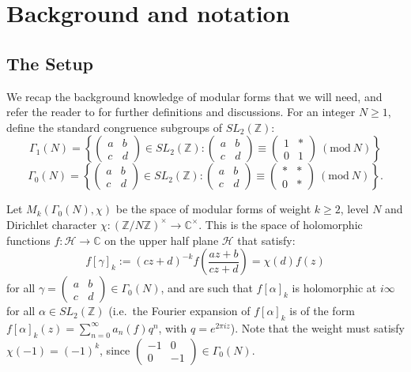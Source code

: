 \documentclass{amsart}
\theoremstyle{plain}
\theoremstyle{definition}
\newcommand*{\field}[1]{\mathbb{#1}}
\begin{document}
\section{Background and notation}
\subsection{The Setup}
We recap the background knowledge of modular forms that we will need, and refer the reader to \cite{diamond_shurman_2016} for further definitions and discussions. For an integer $N \geq 1$, define the standard congruence subgroups of $SL_2(\field{Z})$:
\begin{equation*}
    \Gamma_1(N)=\left\{ \begin{pmatrix} a & b \\ c & d \end{pmatrix} \in SL_2(\field{Z}) : \begin{pmatrix} a & b \\ c & d \end{pmatrix} \equiv \begin{pmatrix} 1 & * \\ 0 & 1 \end{pmatrix} \ (\text{mod} \ N)  \right\}
\end{equation*}
\begin{equation*}
    \Gamma_0(N)=\left\{ \begin{pmatrix} a & b \\ c & d \end{pmatrix} \in SL_2(\field{Z}) : \begin{pmatrix} a & b \\ c & d \end{pmatrix} \equiv \begin{pmatrix} * & * \\ 0 & * \end{pmatrix} \ (\text{mod} \ N)  \right\}.
\end{equation*}

Let $M_k(\Gamma_0(N), \chi)$ be the space of modular forms of weight $k \geq 2$, level $N$ and Dirichlet character $\chi : (\field{Z}/N\field{Z})^\times \rightarrow \field{C}^\times$. This is the space of holomorphic functions $f:\mathcal{H}\rightarrow\mathbb{C}$ on the upper half plane $\mathcal{H}$ that  satisfy:
\begin{equation*}
    f[\gamma]_k:=(cz + d)^{-k} f\left(\frac{az+b}{cz+d} \right) = \chi(d)f(z)
\end{equation*}
for all $\gamma=\begin{pmatrix} a & b \\ c & d \end{pmatrix} \in \Gamma_0(N) $, and are such that $f[\alpha]_k$ is holomorphic at $i\infty$ for all $\alpha \in SL_2(\field{Z})$ (i.e.\ the Fourier expansion of $f[\alpha]_k$ is of the form $f[\alpha]_k(z) = \sum_{n=0}^\infty a_n(f) q^n$, with $q=e^{2\pi i z}$). Note that the weight must satisfy $\chi(-1)=(-1)^k$, since $\begin{pmatrix} -1 & 0 \\ 0 & -1 \end{pmatrix}\in\Gamma_0(N)$.
\end{document}
